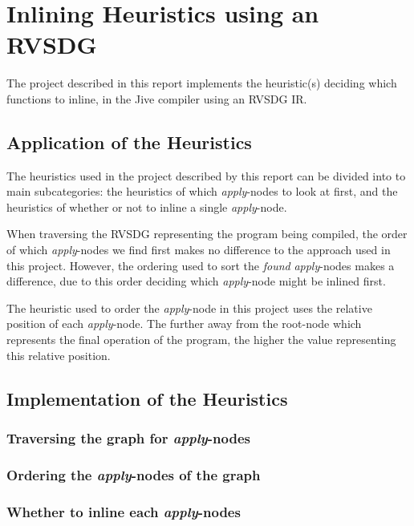 
\clearpage
\section{Inlining Heuristics using an RVSDG}

The project described in this report implements the heuristic(s) deciding which
functions to inline, in the Jive compiler using an RVSDG IR.

\subsection{Application of the Heuristics}

The heuristics used in the project described by this report can be divided into
to main subcategories: the heuristics of which \textit{apply}-nodes to look at
first, and the heuristics of whether or not to inline a single
\textit{apply}-node.

When traversing the RVSDG representing the program being compiled, the order of
which \textit{apply}-nodes we find first makes no difference to the approach
used in this project. However, the ordering used to sort the \textit{found}
\textit{apply}-nodes makes a difference, due to this order deciding which
\textit{apply}-node might be inlined first.

The heuristic used to order the \textit{apply}-node in this project uses the
relative position of each \textit{apply}-node. The further away from the
root-node which represents the final operation of the program, the higher the
value representing this relative position.


\subsection{Implementation of the Heuristics}

\subsubsection{Traversing the graph for \textit{apply}-nodes}

\subsubsection{Ordering the \textit{apply}-nodes of the graph}

\subsubsection{Whether to inline each \textit{apply}-nodes}
